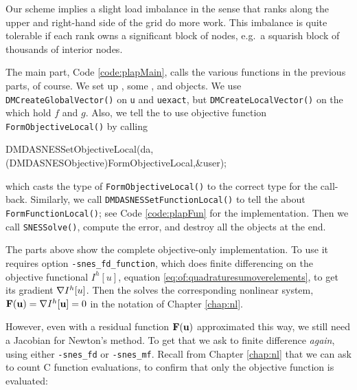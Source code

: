 Our scheme implies a slight load imbalance in the sense that ranks along the upper and right-hand side of the grid do more work.  This imbalance is quite tolerable if each rank owns a significant block of nodes, e.g.~a squarish block of thousands of interior nodes.

The main part, Code \ref{code:plapMain}, calls the various functions in the previous parts, of course.  We set up \pDMDA, some \pVecs, and \pSNES objects.  We use \texttt{DMCreateGlobalVector()} on \texttt{u} and \texttt{uexact}, but \texttt{DMCreateLocalVector()} on the \pVecs which hold $f$ and $g$.  Also, we tell the \pDMDA to use objective function \texttt{FormObjectiveLocal()} by calling
\begin{code}
    DMDASNESSetObjectiveLocal(da,(DMDASNESObjective)FormObjectiveLocal,&user);
\end{code}
which casts the type of \texttt{FormObjectiveLocal()} to the correct type for the call-back.  Similarly, we call \texttt{DMDASNESSetFunctionLocal()} to tell the \pDMDA about \texttt{FormFunctionLocal()}; see Code \ref{code:plapFun} for the implementation.  Then we call \texttt{SNESSolve()}, compute the error, and destroy all the objects at the end.

The parts above show the complete objective-only implementation.  To use it requires option \texttt{-snes\_fd\_function}, which does finite differencing on the objective functional $I^h[u]$, equation \eqref{eq:of:quadraturesumoverelements}, to get its gradient $\nabla I^h[u]$.  Then the \pSNES solves the corresponding nonlinear system, $\mathbf{F}(\mathbf{u}) = \nabla I^h[\mathbf{u}] = 0$ in the notation of Chapter \ref{chap:nl}.

However, even with a residual function $\mathbf{F}(\mathbf{u})$ approximated this way, we still need a Jacobian for Newton's method.  To get that we ask \PETSc to finite difference \emph{again}, using either \texttt{-snes\_fd} or \texttt{-snes\_mf}.  Recall from Chapter \ref{chap:nl} that we can ask \PETSc to count C function evaluations, to confirm that only the objective function is evaluated:

